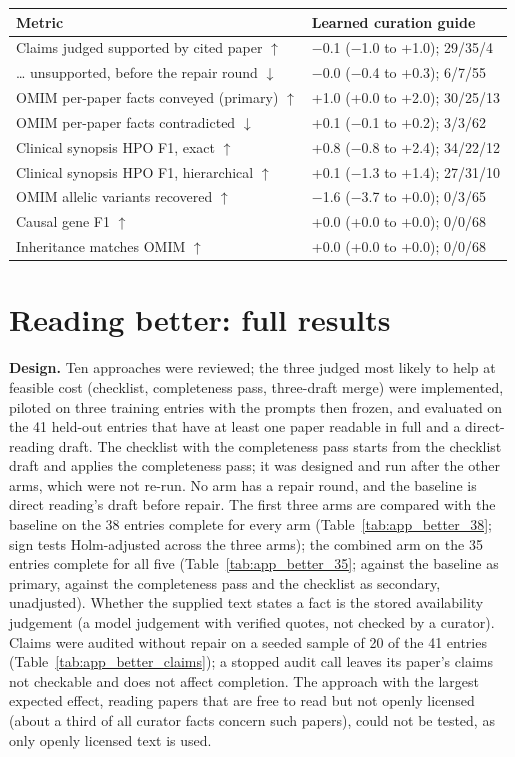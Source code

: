 \documentclass{article} %
\begin{document}
\begin{table}[!htb]
\begin{tabularx}{\linewidth}{>{\raggedright\arraybackslash}p{5.6cm}>{\centering\arraybackslash}X}
\toprule
Metric & Learned curation guide \\
\midrule
Claims judged supported by cited paper $\uparrow$ & $-$0.1 ($-$1.0 to +1.0); 29/35/4 \\
\ldots{} unsupported, before the repair round $\downarrow$ & $-$0.0 ($-$0.4 to +0.3); 6/7/55 \\
OMIM per-paper facts conveyed (primary) $\uparrow$ & +1.0 (+0.0 to +2.0); 30/25/13 \\
OMIM per-paper facts contradicted $\downarrow$ & +0.1 ($-$0.1 to +0.2); 3/3/62 \\
Clinical synopsis HPO F1, exact $\uparrow$ & +0.8 ($-$0.8 to +2.4); 34/22/12 \\
Clinical synopsis HPO F1, hierarchical $\uparrow$ & +0.1 ($-$1.3 to +1.4); 27/31/10 \\
OMIM allelic variants recovered $\uparrow$ & $-$1.6 ($-$3.7 to +0.0); 0/3/65 \\
Causal gene F1 $\uparrow$ & +0.0 (+0.0 to +0.0); 0/0/68 \\
Inheritance matches OMIM $\uparrow$ & +0.0 (+0.0 to +0.0); 0/0/68 \\
\bottomrule
\end{tabularx}
\end{table}

\FloatBarrier
\FloatBarrier
\section{Reading better: full results}
\label{app:better}
\textbf{Design.} Ten approaches were reviewed; the three judged most likely to help at feasible cost (checklist, completeness pass, three-draft merge) were implemented, piloted on three training entries with the prompts then frozen, and evaluated on the 41 held-out entries that have at least one paper readable in full and a direct-reading draft. The checklist with the completeness pass starts from the checklist draft and applies the completeness pass; it was designed and run after the other arms, which were not re-run. No arm has a repair round, and the baseline is direct reading's draft before repair. The first three arms are compared with the baseline on the 38 entries complete for every arm (Table~\ref{tab:app_better_38}; sign tests Holm-adjusted across the three arms); the combined arm on the 35 entries complete for all five (Table~\ref{tab:app_better_35}; against the baseline as primary, against the completeness pass and the checklist as secondary, unadjusted). Whether the supplied text states a fact is the stored availability judgement (a model judgement with verified quotes, not checked by a curator). Claims were audited without repair on a seeded sample of 20 of the 41 entries (Table~\ref{tab:app_better_claims}); a stopped audit call leaves its paper's claims not checkable and does not affect completion. The approach with the largest expected effect, reading papers that are free to read but not openly licensed (about a third of all curator facts concern such papers), could not be tested, as only openly licensed text is used.
\end{document}
